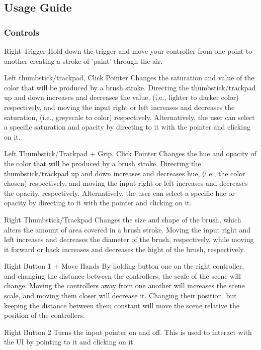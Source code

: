 \documentclass[onecolumn, draftclsnofoot,10pt, compsoc]{IEEEtran}
\newcounter{threesection}[subsubsection]
\begin{document}
\subsection{Usage Guide}
\subsubsection{Controls}
Right Trigger Hold down the trigger and move your controller from one point to another creating a stroke of 'paint' through the air.

Left thumbstick/trackpad, Click Pointer Changes the saturation and value of the color that will be produced by a brush stroke.
Directing the thumbstick/trackpad up and down increases and decreases the value, (i.e., lighter to darker color) respectively, and moving the input right or left increases and decreases the saturation, (i.e., greyscale to color) respectively.
Alternatively, the user can select a specific saturation and opacity by directing to it with the pointer and clicking on it.

Left Thumbstick/Trackpad + Grip, Click Pointer Changes the hue and opacity of the color that will be produced by a brush stroke.
Directing the thumbstick/trackpad up and down increases and decreases hue, (i.e., the color chosen) respectively, and moving the input right or left increases and decreases the opacity, respectively.
Alternatively, the user can select a specific hue or opacity by directing to it with the pointer and clicking on it.

Right Thumbstick/Trackpad Changes the size and shape of the brush, which alters the amount of area covered in a brush stroke.
Moving the input right and left increases and decreases the diameter of the brush, respectively, while moving it forward or back increases and decreases the hight of the brush, respectively.

Right Button 1 + Move Hands By holding button one on the right controller, and changing the distance between the controllers, the scale of the scene will change.
Moving the controllers away from one another will increases the scene scale, and moving them closer will decrease it.
Changing their position, but keeping the distance between them constant will move the scene relative the position of the controllers.

Right Button 2 Turns the input pointer on and off.
This is used to interact with the UI by pointing to it and clicking on it.
\end{document}
